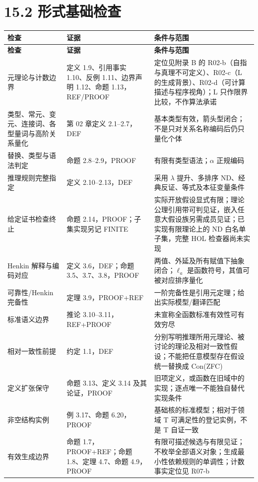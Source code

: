 \documentclass[UTF8,a4paper,zihao=-4,fontset=windows,openany]{ctexbook}
\begin{document}
\section{15.2 形式基础检查}
\begingroup\small\setlength{\tabcolsep}{4pt}
\begin{longtable}{>{\raggedright\arraybackslash}p{}>{\raggedright\arraybackslash}p{}>{\raggedright\arraybackslash}p{}}
\toprule
\textbf{检查} & \textbf{证据} & \textbf{条件与范围} \\
\midrule
\endfirsthead
\toprule
\textbf{检查} & \textbf{证据} & \textbf{条件与范围} \\
\midrule
\endhead
\bottomrule
\endfoot
\bottomrule
\endlastfoot
元理论与计数边界 & 定义 1.9、引用事实 1.10、反例 1.11、边界声明 1.12、命题 1.13，REF/PROOF & 定位见附录 B 的 R02-b（自指与真理不可定义）、R02-c（L 的生成背景）、R02-d（可计算描述与程序视角）；L 只作限界比较，不作算法承诺 \\
类型、常元、变元、连接词、各型量词与高阶关系量化 & 第 02 章定义 2.1–2.7，DEF & 基本类型有效，箭头型闭合；不是只对关系名称编码后仍只量化个体 \\
替换、类型与语法判定 & 命题 2.8–2.9，PROOF & 有限有类型语法；\(\alpha\) 正规编码 \\
推理规则完整指定 & 定义 2.10–2.13，DEF & 采用 \(\lambda\) 提升、多排序 ND、经典反证、等式及本征变量条件 \\
给定证书检查终止 & 命题 2.14，PROOF；子集实现另记 FINITE & 实际开放假设显式有限；理论公理引用带可判见证，嵌入任意大假设族另需成员见证；已实现有限理论上的 ND 白名单子集，完整 HOL 检查器尚未实现 \\
Henkin 解释与编码对应 & 定义 3.6，DEF；命题 3.5、3.7、3.8，PROOF & 两值、外延及所有赋值下抽象闭合；\(\ell_a\) 是函数符号，其值可被对应排序量化 \\
可靠性/Henkin 完备性 & 定理 3.9，PROOF+REF & 一阶完备性是引用元定理；给出实际模型/翻译匹配 \\
标准语义边界 & 推论 3.10–3.11，REF+PROOF & 未宣称全函数标准有效性可有效穷尽 \\
相对一致性前提 & 约定 1.1，DEF & 分别写明推理所用元理论、被讨论的理论及相对一致性假设；不能把任意模型存在假设统一替换成 Con(ZFC) \\
定义扩张保守 & 命题 3.13、定义 3.14 及其论证，PROOF & 旧项定义，或函数在旧域中的实现；逐点唯一不能独自替代实现条件 \\
非空结构实例 & 例 3.17、命题 6.20，PROOF & 基础核的标准模型；相对于领域 T 可满足性的登记实例，不是 T 自证一致 \\
有效生成边界 & 命题 1.7，PROOF+REF；命题 1.8、定理 4.7、命题 4.9，PROOF & 有限可描述候选与有限见证；不枚举全部语义对象；生成最小性依赖规则的单调性；计数事实定位见 R07-b \\
\end{longtable}
\endgroup
\end{document}
